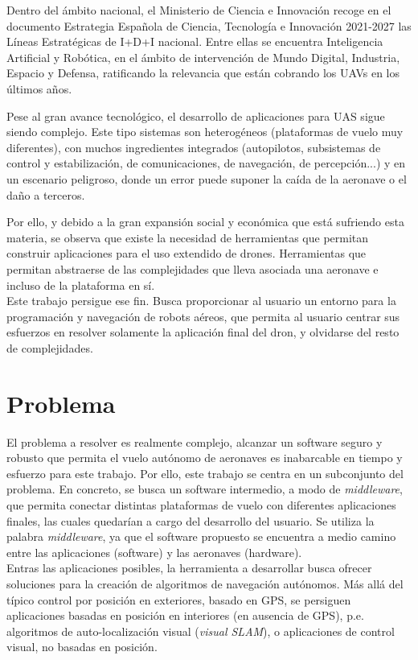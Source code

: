 \documentclass[../main.tex]{subfiles}
\begin{document}
Dentro del ámbito nacional, el Ministerio de Ciencia e Innovación recoge en el documento Estrategia Española de Ciencia, Tecnología e Innovación 2021-2027 \cite{eecti-2021} las Líneas Estratégicas de I+D+I nacional. Entre ellas se encuentra Inteligencia Artificial y Robótica, en el ámbito de intervención de Mundo Digital, Industria, Espacio y Defensa, ratificando la relevancia que están cobrando los UAVs en los últimos años.

Pese al gran avance tecnológico, el desarrollo de aplicaciones para UAS sigue siendo complejo. Este tipo sistemas son heterogéneos (plataformas de vuelo muy diferentes), con muchos ingredientes integrados (autopilotos, subsistemas de control y estabilización, de comunicaciones, de navegación, de percepción...) y en un escenario peligroso, donde un error puede suponer la caída de la aeronave o el daño a terceros.

Por ello, y debido a la gran expansión social y económica que está sufriendo esta materia, se observa que existe la necesidad de herramientas que permitan construir aplicaciones para el uso extendido de drones. Herramientas que permitan abstraerse de las complejidades que lleva asociada una aeronave e incluso de la plataforma en sí. \\
Este trabajo persigue ese fin. Busca proporcionar al usuario un entorno para la programación y navegación de robots aéreos, que permita al usuario centrar sus esfuerzos en resolver solamente la aplicación final del dron, y olvidarse del resto de complejidades.

\section{Problema} \label{section:intro-problema}
El problema a resolver es realmente complejo, alcanzar un software seguro y robusto que permita el vuelo autónomo de aeronaves es inabarcable en tiempo y esfuerzo para este trabajo. Por ello, este trabajo se centra en un subconjunto del problema. En concreto, se busca un software intermedio, a modo de \emph{middleware}, que permita conectar distintas plataformas de vuelo con diferentes aplicaciones finales, las cuales quedarían a cargo del desarrollo del usuario.
Se utiliza la palabra \emph{middleware}, ya que el software propuesto se encuentra a medio camino entre las aplicaciones (software) y las aeronaves (hardware). \\
Entras las aplicaciones posibles, la herramienta a desarrollar busca ofrecer soluciones para la creación de algoritmos de navegación autónomos. Más allá del típico control por posición en exteriores, basado en GPS, se persiguen aplicaciones basadas en posición en interiores (en ausencia de GPS), p.e. algoritmos de auto-localización visual (\emph{visual SLAM}), o aplicaciones de control visual, no basadas en posición.
\end{document}
